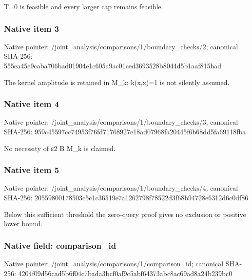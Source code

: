 \documentclass[10pt,a4paper]{article}
\begin{document}
\begingroup\raggedright\sloppy T=\allowbreak{}0 is feasible and every larger cap remains feasible.\par\endgroup

\subsubsection{Native item 3}
Native pointer: /joint\_\allowbreak{}analysis/comparisons/1/boundary\_\allowbreak{}checks/2; canonical SHA-256: 555ea45e9caba706bad01904e1c605a9ac01ced3693528b8044d5b1aaf815bad

\begingroup\raggedright\sloppy The kernel amplitude is retained in M\_\allowbreak{}k;\allowbreak{} k(x,\allowbreak{}x)=\allowbreak{}1 is not silently assumed.\par\endgroup

\subsubsection{Native item 4}
Native pointer: /joint\_\allowbreak{}analysis/comparisons/1/boundary\_\allowbreak{}checks/3; canonical SHA-256: 959c45597cc74953f76fd71768927e18ad07968fa20445f6b68dd5fa69118fba

\begingroup\raggedright\sloppy No necessity of {\AtlasUnicodeText ε}\allowbreak{}2 B M\_\allowbreak{}k is claimed.\par\endgroup

\subsubsection{Native item 5}
Native pointer: /joint\_\allowbreak{}analysis/comparisons/1/boundary\_\allowbreak{}checks/4; canonical SHA-256: 20559800178503c5c1c36519e7a1262798f78522d3f68b94728e6312d6c0df86

\begingroup\raggedright\sloppy Below this sufficient threshold the zero-query proof gives no exclusion or positive lower bound.\par\endgroup

\subsubsection{Native field: comparison\_\allowbreak{}id}
Native pointer: /joint\_\allowbreak{}analysis/comparisons/1/comparison\_\allowbreak{}id; canonical SHA-256: 4204f09d56cad5b6f04c7bada3bcf0af9c5abf64373abc8ac69ad8a24b239bc0
\end{document}
